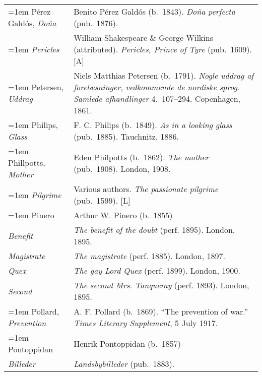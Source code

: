 \begin{xltabular}{\textwidth}{ lQ }
\hangindent=1em  Pérez Galdós, \textit{Doña} & Benito Pérez Galdós (b.~1843). \textit{Doña perfecta} (pub.~1876). \\

\hangindent=1em  \textit{Pericles} & William Shakespeare \& George Wilkins (attributed). \textit{Pericles, Prince of Tyre} (pub.~1609). [A] \\

\hangindent=1em  Petersen, \textit{Uddrag} & Niels Matthias Petersen (b.~1791). \textit{Nogle uddrag af forelæsninger, vedkommende de nordiske sprog}. \textit{Samlede afhandlinger} 4.~107--294. Copenhagen, 1861. \\ 

\hangindent=1em  Philips, \textit{Glass} & F. C. Philips (b.~1849). \textit{As in a looking glass} (pub.~1885). Tauchnitz, 1886.  \\

\hangindent=1em  Phillpotts, \textit{Mother} & Eden Philpotts (b.~1862). \textit{The mother} (pub.~1908). London, 1908.  \\

\hangindent=1em  \textit{Pilgrime} & Various authors. \textit{The passionate pilgrime} (pub.~1599). [L] \\

\hangindent=1em  Pinero & Arthur W. Pinero (b.~1855) \\
\hspace{1em}\textit{Benefit} & \textit{The benefit of the doubt} (perf. 1895). London, 1895.  \\
\hspace{1em}\textit{Magistrate} & \textit{The magistrate} (perf. 1885). London, 1897.  \\
\hspace{1em}\textit{Quex} & \textit{The gay Lord Quex} (perf. 1899). London, 1900.  \\
\hspace{1em}\textit{Second} & \textit{The second Mrs. Tanqueray} (perf. 1893). London, 1895.  \\

\hangindent=1em  Pollard, \textit{Prevention} & A. F. Pollard (b.~1869). ``The prevention of war.'' \textit{Times Literary Supplement}, 5 July 1917. \\ %

\hangindent=1em  Pontoppidan & Henrik Pontoppidan (b.~1857)\\
\hspace{1em}\textit{Billeder} & \textit{Landsbybilleder} (pub.~1883). \\


\end{xltabular}
